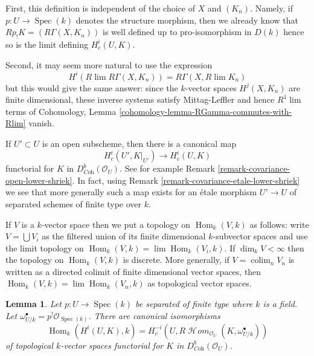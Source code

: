 \documentclass{stacks-project}
\theoremstyle{plain}
\newtheorem{lemma}[subsection]{Lemma}
\theoremstyle{definition}
\theoremstyle{remark}
\numberwithin{equation}{subsection}
\def\lim{\mathop{\mathrm{lim}}\nolimits}
\def\colim{\mathop{\mathrm{colim}}\nolimits}
\def\Spec{\mathop{\mathrm{Spec}}}
\def\Hom{\mathop{\mathrm{Hom}}\nolimits}
\def\SheafHom{\mathop{\mathcal{H}\!\mathit{om}}\nolimits}
\begin{document}
\medskip\noindent
First, this definition is independent of the choice of $X$ and $(K_n)$.
Namely, if $p : U \to \Spec(k)$ denotes the structure morphism, then
we already know that $Rp_!K = (R\Gamma(X, K_n))$
is well defined up to pro-isomorphism in $D(k)$ hence so is the limit
defining $H^i_c(U, K)$.

\medskip\noindent
Second, it may seem more natural to use the expression
$$
H^i(R\lim R\Gamma(X, K_n)) = R\Gamma(X, R\lim K_n)
$$
but this would give the same answer: since the $k$-vector spaces
$H^j(X, K_n)$ are finite dimensional, these inverse systems satisfy
Mittag-Leffler and hence $R^1\lim$ terms of Cohomology, Lemma
\ref{cohomology-lemma-RGamma-commutes-with-Rlim} vanish.

\medskip\noindent
If $U' \subset U$ is an open subscheme, then there is a canonical map
$$
H^i_c(U', K|_{U'}) \longrightarrow H^i_c(U, K)
$$
functorial for $K$ in $D^b_{\textit{Coh}}(\mathcal{O}_U)$.
See for example Remark \ref{remark-covariance-open-lower-shriek}.
In fact, using Remark \ref{remark-covariance-etale-lower-shriek}
we see that more generally such a map exists for an \'etale morphism
$U' \to U$ of separated schemes of finite type over $k$.

\medskip\noindent
If $V$ is a $k$-vector space then we put a topology on $\Hom_k(V, k)$
as follows: write $V = \bigcup V_i$ as the filtered union of its finite
dimensional $k$-subvector spaces and use the limit topology on
$\Hom_k(V, k) = \lim \Hom_k(V_i, k)$. If $\dim_k V < \infty$ then
the topology on $\Hom_k(V, k)$ is discrete. More generally, if
$V = \colim_n V_n$ is written as a directed colimit of finite dimensional
vector spaces, then $\Hom_k(V, k) = \lim \Hom_k(V_n, k)$ as topological
vector spaces.

\begin{lemma}
\label{lemma-duality-compact-support}
Let $p : U \to \Spec(k)$ be separated of finite type where $k$ is a field.
Let $\omega_{U/k}^\bullet = p^!\mathcal{O}_{\Spec(k)}$.
There are canonical isomorphisms
$$
\Hom_k(H^i(U, K), k) =
H^{-i}_c(U, R\SheafHom_{\mathcal{O}_U}(K, \omega_{U/k}^\bullet))
$$
of topological $k$-vector spaces
functorial for $K$ in $D^b_{\textit{Coh}}(\mathcal{O}_U)$.
\end{lemma}
\end{document}
